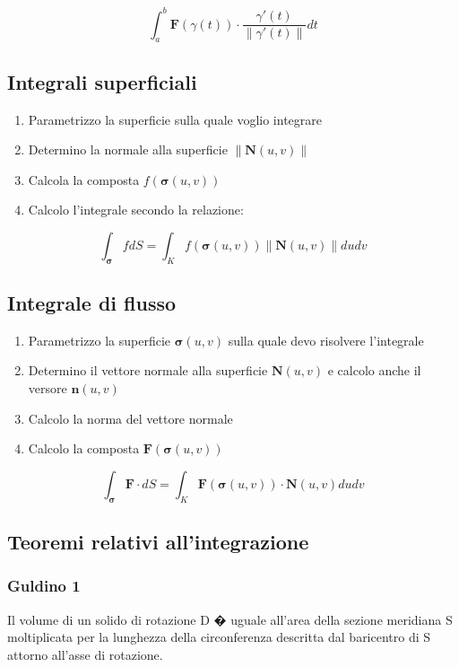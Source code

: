 \documentclass[10pt,a4paper]{report}
\newcommand{\norm}[1]{ \left\lVert {#1} \right\rVert}
\begin{document}
		\[ \int_{a}^{b} \mathbf{F}(\gamma (t)) \cdot \frac{\gamma '(t)}{\norm{\gamma '(t)}} dt \]
		
		\subsection*{Integrali \textbf{superficiali}}
			\begin{enumerate}
				\item Parametrizzo la superficie sulla quale voglio integrare
				\item Determino la normale alla superficie $\norm{\mathbf{N}(u,v)}$
				\item Calcola la composta $f(\mathbf{\sigma} (u,v))$
				\item Calcolo l'integrale secondo la relazione:
			\end{enumerate}
		\[ \int_{\mathbf{\sigma}} fdS = \int_{K} f(\mathbf{\sigma} (u,v)) \norm{\mathbf{N}(u,v)}dudv \]
		
		\subsection*{Integrale di \textbf{flusso}}
		
		\begin{enumerate}
			\item Parametrizzo la superficie $ \mathbf{\sigma}(u,v) $ sulla quale devo risolvere l'integrale 
			\item Determino il vettore normale alla superficie $ \mathbf{N}(u,v) $ e calcolo anche il versore $ \mathbf{n}(u,v) $
			\item Calcolo la norma del vettore normale 
			\item Calcolo la composta $ \mathbf{F}(\mathbf{\sigma}(u,v)) $
		\end{enumerate}
		
		\[  \int_{\mathbf{\sigma}} \mathbf{F} \cdot dS = \int_{K} \mathbf{F}(\mathbf{\sigma}(u,v)) \cdot \mathbf{N}(u,v) dudv\]
		
		\subsection*{Teoremi relativi all'integrazione}
		
			\subsubsection{Guldino 1}
			Il volume di un solido di rotazione D � uguale all'area della sezione meridiana S moltiplicata per la lunghezza della circonferenza descritta dal baricentro di S attorno all'asse di rotazione.
			
\end{document}
